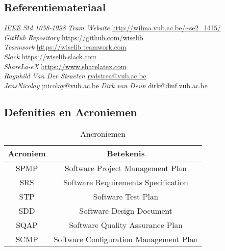 \subsection{Referentiemateriaal}

\begin{thebibliography}{9}
 \emph{IEEE Std 1058-1998}  
 \emph{Team Website} \url{http://wilma.vub.ac.be/~se2_1415/} \\
 \emph{GitHub Repository} \url{https://github.com/wiselib} \\
 \emph{Teamwork} \url{https://wiselib.teamwork.com} \\
 \emph{Slack} \url{https://wiselib.slack.com} \\
 \emph{ShareLa-eX} \url{https://www.sharelatex.com} \\

 \emph{Ragnhild Van Der Straeten} \href{mailto:rvdstrea@vub.ac.be}{rvdstrea@vub.ac.be} \\
 \emph{JensNicolay} \href{mailto:jnicolay@vub.ac.be}{jnicolay@vub.ac.be} 
 \emph{Dirk van Deun} \href{mailto:dirk@dinf.vub.ac.be}{dirk@dinf.vub.ac.be}
\end{thebibliography}

\subsection{Defenities en Acroniemen}

\begin{table}[h]
\centering
\begin{tabular}{c|c}
\textbf{Acroniem} & \textbf{Betekenis} \\
\hline
SPMP & Software Project Management Plan  \\
SRS & Software Requirements Specification \\
STP & Software Test Plan \\
SDD & Software Design Document \\
SQAP & Software Quality Assurance Plan \\
SCMP & Software Configuration Management Plan 
\end{tabular}
\caption{Ancroniemen}
\label{tab:my_label}
\end{table}
